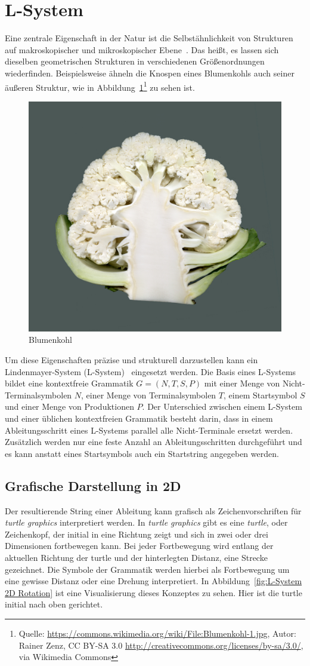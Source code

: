 \section{L-System}
Eine zentrale Eigenschaft in der Natur ist die Selbstähnlichkeit von Strukturen auf makroskopischer und mikroskopischer Ebene~\cite{Shaker2016}.
Das heißt, es lassen sich dieselben geometrischen Strukturen in verschiedenen Größenordnungen wiederfinden.
Beispielsweise ähneln die Knospen eines Blumenkohls auch seiner äußeren Struktur, wie in Abbildung~\ref{fig:Blumenkohl}\footnote{Quelle: \url{https://commons.wikimedia.org/wiki/File:Blumenkohl-1.jpg}, Autor: Rainer Zenz, CC BY-SA 3.0 \url{http://creativecommons.org/licenses/by-sa/3.0/}, via Wikimedia Commons} zu sehen ist.
\begin{figure}[ht]
    \centering
    \includegraphics[width=0.5\linewidth]{chapters/02_Grundlagen/L_System/Blumenkohl-1.jpg}
    \caption{Blumenkohl}\label{fig:Blumenkohl}
\end{figure}

Um diese Eigenschaften präzise und strukturell darzustellen kann ein Lindenmayer-System (L-System)~\cite{lindenmayer1990} eingesetzt werden.
Die Basis eines L-Systems bildet eine kontextfreie Grammatik $G=(N,T,S,P)$ mit einer Menge von Nicht-Terminalsymbolen $N$, einer Menge von Terminalsymbolen $T$, einem Startsymbol $S$ und einer Menge von Produktionen $P$.
Der Unterschied zwischen einem L-System und einer üblichen kontextfreien Grammatik besteht darin, dass in einem Ableitungsschritt eines L-Systems parallel alle Nicht-Terminale ersetzt werden.
Zusätzlich werden nur eine feste Anzahl an Ableitungsschritten durchgeführt und es kann anstatt eines Startsymbols auch ein Startstring angegeben werden.

\subsection{Grafische Darstellung in 2D}
Der resultierende String einer Ableitung kann grafisch als Zeichenvorschriften für \emph{turtle graphics} interpretiert werden.
In \emph{turtle graphics} gibt es eine \emph{turtle}, oder Zeichenkopf, der initial in eine Richtung zeigt und sich in zwei oder drei Dimensionen fortbewegen kann.
Bei jeder Fortbewegung wird entlang der aktuellen Richtung der turtle und der hinterlegten Distanz, eine Strecke gezeichnet.
Die Symbole der Grammatik werden hierbei als Fortbewegung um eine gewisse Distanz oder eine Drehung interpretiert.
In Abbildung~\ref{fig:L-System 2D Rotation} ist eine Visualisierung dieses Konzeptes zu sehen.
Hier ist die turtle initial nach oben gerichtet.

